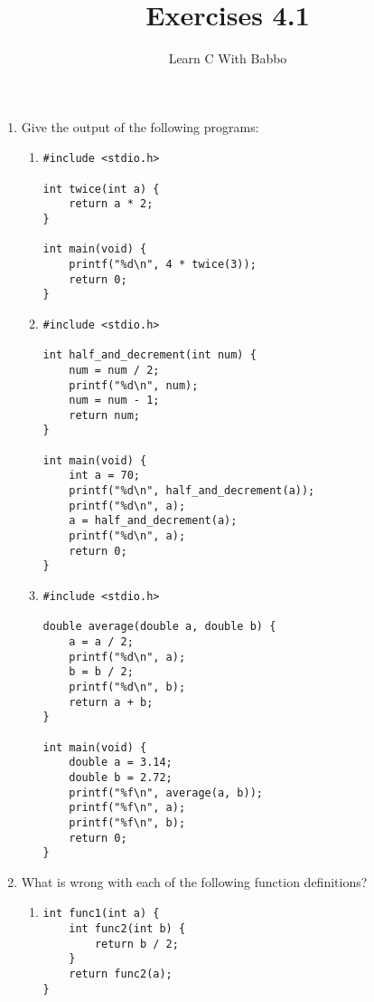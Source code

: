 \documentclass{article}
\begin{document}
\title{Exercises 4.1}
\author{Learn C With Babbo}
\date{}
\maketitle
\begin{enumerate}
\item Give the output of the following programs:
\begin{enumerate}
\item 
\begin{lstlisting}[style=CStyle]
#include <stdio.h>

int twice(int a) {
    return a * 2;
}

int main(void) {
    printf("%d\n", 4 * twice(3));
    return 0;
}
\end{lstlisting}

\item
\begin{lstlisting}[style=CStyle]
#include <stdio.h>

int half_and_decrement(int num) {
    num = num / 2;
    printf("%d\n", num);
    num = num - 1;
    return num;
}

int main(void) {
    int a = 70;
    printf("%d\n", half_and_decrement(a));
    printf("%d\n", a);
    a = half_and_decrement(a);
    printf("%d\n", a);
    return 0;
}
\end{lstlisting}

\item
\begin{lstlisting}[style=CStyle]
#include <stdio.h>

double average(double a, double b) {
    a = a / 2;
    printf("%d\n", a);
    b = b / 2;
    printf("%d\n", b);
    return a + b;
}

int main(void) {
    double a = 3.14;
    double b = 2.72;
    printf("%f\n", average(a, b));
    printf("%f\n", a);
    printf("%f\n", b);
    return 0;
}

\end{lstlisting}
\end{enumerate}
\item What is wrong with each of the following function definitions?
\begin{enumerate}
\item
\begin{lstlisting}[style=CStyle]
int func1(int a) {
    int func2(int b) {
        return b / 2;
    }
    return func2(a);
}
\end{lstlisting}


\end{enumerate}
\end{enumerate}
\end{document}
